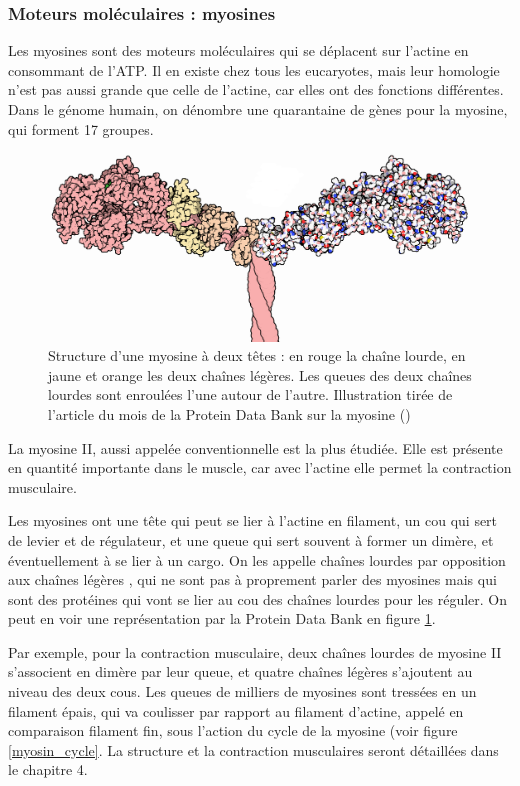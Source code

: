\subsubsection{Moteurs moléculaires : myosines}

Les myosines sont des moteurs moléculaires qui se déplacent sur l'actine en consommant de l'ATP. Il en existe chez tous les eucaryotes, mais leur homologie n'est pas aussi grande que celle de l'actine, car elles ont des fonctions différentes. Dans le génome humain, on dénombre une quarantaine de gènes pour la myosine, qui forment 17 groupes.

\begin{figure}
\includegraphics[scale=3]{Figures/18-Myosin-1b7t.png} 
\caption{Structure d'une myosine à deux têtes : en rouge la chaîne lourde, en jaune et orange les deux chaînes légères. Les queues des deux chaînes lourdes sont enroulées l'une autour de l'autre. Illustration tirée de l'article du mois de la Protein Data Bank sur la myosine (\cite{goodsell_molecule_2010}) \label{myosin}}
\end{figure}

La myosine II, aussi appelée \og conventionnelle \fg est la plus étudiée. Elle est présente en quantité importante dans le muscle, car avec l'actine elle permet la contraction musculaire. 

Les myosines ont une tête qui peut se lier à l'actine en filament, un cou  qui sert de levier et de régulateur, et une queue qui sert souvent à former un dimère, et éventuellement à se lier à un cargo. On les appelle \og chaînes lourdes \fg par opposition aux \og chaînes légères \fg, qui ne sont pas à proprement parler des myosines mais qui sont des protéines qui vont se lier au cou des \og chaînes lourdes \fg pour les réguler. On peut en voir une représentation par la Protein Data Bank en figure \ref{myosin}.

Par exemple, pour la contraction musculaire, deux chaînes lourdes de myosine II s'associent en dimère par leur queue, et quatre chaînes légères s'ajoutent au niveau des deux cous. Les queues de milliers de myosines sont tressées en un filament épais, qui va coulisser par rapport au filament d'actine, appelé en comparaison filament fin, sous l'action du cycle de la myosine (voir figure \ref{myosin_cycle}. La structure et la contraction musculaires seront détaillées dans le chapitre 4. 

